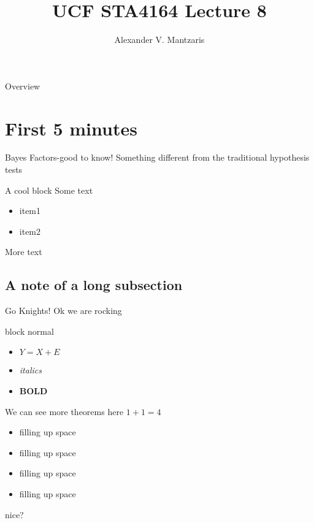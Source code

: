 \documentclass{beamer}
\title[Lect 8]{UCF STA4164 Lecture 8}
\author{Alexander V. Mantzaris}
\date{\vspace{-8cm}}
\begin{document}
\begin{frame}
  \titlepage
\end{frame}

\begin{frame}{Overview}
\tableofcontents
\end{frame}

\section{First 5 minutes}

\begin{frame}{Bayes Factors-good to know!} 
  Something different from the traditional hypothesis tests
  \begin{block}{A cool block}
    Some text
    \begin{itemize}
    \item item1
    \item item2
    \end{itemize}
  \end{block}
  More text
\end{frame}


\subsection{A note of a long subsection}
\begin{frame}{Go Knights!} 
  Ok we are rocking
  \begin{block}{block normal}
    \begin{itemize}
    \item $Y = X + E$
    \item \emph{italics}
      \item \textbf{BOLD}
    \end{itemize}
  \end{block}
  \begin{block}{We can see more theorems here}
    $1+1 = 4$
    \begin{itemize}
    \item filling up space
    \item filling up space
       \item filling up space
    \item filling up space
    \end{itemize}
    nice?
  \end{block}
  
\end{frame}
\end{document}
